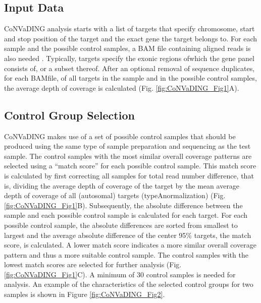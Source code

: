 \subsection{Input Data}
CoNVaDING analysis starts with a list of targets that specify chromosome, start and stop position of the target and the exact gene the target belongs to. 
For each sample and the possible control samples, a BAM file containing aligned reads is also needed \cite{Li_2009}. 
Typically, targets specify the exonic regions ofwhich the gene panel consists of, or a subset thereof. 
After an optional removal of sequence duplicates, for each BAMfile, of all targets in the sample and in the possible control samples, the average depth of coverage is calculated (Fig. \ref{fig:CoNVaDING_Fig1}A).

\subsection{Control Group Selection}
CoNVaDING makes use of a set of possible control samples that should be produced using the same type of sample preparation and sequencing as the test sample. 
The control samples with the most similar overall coverage patterns are selected using a “match score” for each possible control sample. 
This match score is calculated by first correcting all samples for total read number difference, that is, dividing the average depth of coverage of the target by the mean average depth of coverage of all (autosomal) targets (typeAnormalization) (Fig. \ref{fig:CoNVaDING_Fig1}B). 
Subsequently, the absolute difference between the sample and each possible control sample is calculated for each target. 
For each possible control sample, the absolute differences are sorted from smallest to largest and the average absolute difference of the center 95\% targets, the match score, is calculated. 
A lower match score indicates a more similar overall coverage pattern and thus a more suitable control sample. The control samples with the lowest match scores are selected for further analysis (Fig. \ref{fig:CoNVaDING_Fig1}C). 
A minimum of 30 control samples is needed for analysis. 
An example of the characteristics of the selected control groups for two samples is shown in Figure \ref{fig:CoNVaDING_Fig2}.


